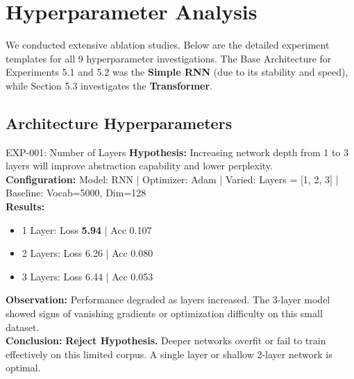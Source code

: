 \documentclass[12pt,a4paper]{article}
\begin{document}
\section{Hyperparameter Analysis}

We conducted extensive ablation studies. Below are the detailed experiment templates for all 9 hyperparameter investigations. The Base Architecture for Experiments 5.1 and 5.2 was the \textbf{Simple RNN} (due to its stability and speed), while Section 5.3 investigates the \textbf{Transformer}.

\subsection{Architecture Hyperparameters}

\begin{experimentbox}{EXP-001: Number of Layers}
\textbf{Hypothesis:} Increasing network depth from 1 to 3 layers will improve abstraction capability and lower perplexity. \\
\textbf{Configuration:} Model: RNN | Optimizer: Adam | Varied: Layers = [1, 2, 3] | Baseline: Vocab=5000, Dim=128 \\
\textbf{Results:}
\begin{itemize}
    \item 1 Layer: Loss \textbf{5.94} | Acc 0.107
    \item 2 Layers: Loss 6.26 | Acc 0.080
    \item 3 Layers: Loss 6.44 | Acc 0.053
\end{itemize}
\textbf{Observation:} Performance degraded as layers increased. The 3-layer model showed signs of vanishing gradients or optimization difficulty on this small dataset. \\
\textbf{Conclusion:} \textbf{Reject Hypothesis.} Deeper networks overfit or fail to train effectively on this limited corpus. A single layer or shallow 2-layer network is optimal.
\end{experimentbox}

\vspace{0.5cm}
\end{document}
